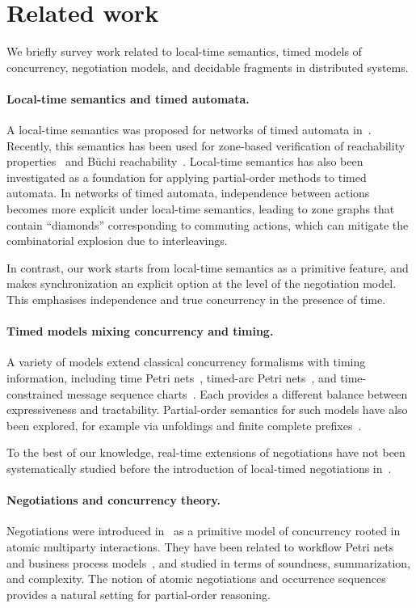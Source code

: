 \section{Related work}
\label{sec:related}

We briefly survey work related to local-time semantics, timed models of concurrency, negotiation models, and decidable fragments in distributed systems.

\paragraph{Local-time semantics and timed automata.}
A local-time semantics was proposed for networks of timed automata in~\cite{LocalTimeTA}. Recently, this semantics has been used for zone-based verification of reachability properties~\cite{LocalZone1,LocalZone2} and B\"uchi reachability~\cite{LocalBuchi}. Local-time semantics has also been investigated as a foundation for applying partial-order methods to timed automata. In networks of timed automata, independence between actions becomes more explicit under local-time semantics, leading to zone graphs that contain ``diamonds'' corresponding to commuting actions, which can mitigate the combinatorial explosion due to interleavings.

In contrast, our work starts from local-time semantics as a primitive feature, and makes synchronization an explicit option at the level of the negotiation model. This emphasises independence and true concurrency in the presence of time.

\paragraph{Timed models mixing concurrency and timing.}
A variety of models extend classical concurrency formalisms with timing information, including time Petri nets~\cite{MerlinTimePN}, timed-arc Petri nets~\cite{HansenTimedArc}, and time-constrained message sequence charts~\cite{AlurMSC}. Each provides a different balance between expressiveness and tractability. Partial-order semantics for such models have also been explored, for example via unfoldings and finite complete prefixes~\cite{EsparzaUnfoldings,KhomenkoTimePN}.

To the best of our knowledge, real-time extensions of negotiations have not been systematically studied before the introduction of local-timed negotiations in~\cite{LTNOriginal}.

\paragraph{Negotiations and concurrency theory.}
Negotiations were introduced in~\cite{EsparzaDeselNegotiations} as a primitive model of concurrency rooted in atomic multiparty interactions. They have been related to workflow Petri nets and business process models~\cite{EsparzaWorkflow,EsparzaFreeChoice}, and studied in terms of soundness, summarization, and complexity. The notion of atomic negotiations and occurrence sequences provides a natural setting for partial-order reasoning.

